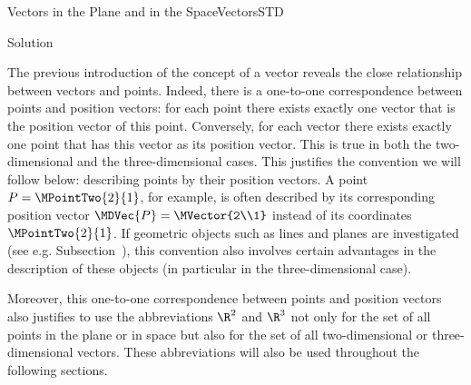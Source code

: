 \begin{MXContent}{Vectors in the Plane and in the Space}{Vectors}{STD}
\begin{MExercise}
\begin{MHint}{Solution}
\begin{itemize}
\begin{center}
\end{center}

\end{itemize}

\end{MHint}

\end{MExercise}

The previous introduction of the concept of a vector reveals the close relationship between vectors and points. Indeed, there 
is a one-to-one correspondence between points and position vectors: for each point there exists exactly one vector that is the position vector
of this point. Conversely, for each vector there exists exactly one point that has this vector as its position vector. 
This is true in both the two-dimensional and the three-dimensional cases. This justifies the convention we will follow below: 
describing points by their position vectors. A point $P=\MPointTwo{2}{1}$, for example, is often described by its corresponding 
position vector $\MDVec{P}=\MVector{2\\1}$ instead of its coordinates $\MPointTwo{2}{1}$. If geometric objects such as lines 
and planes are investigated (see e.g. Subsection~), this convention also involves certain 
advantages in the description of these objects (in particular in the three-dimensional case).

Moreover, this one-to-one correspondence between points and position vectors also justifies to use the abbreviations 
$\R^2$ and $\R^3$ not only for the set of all points in the plane or in space but also for the set of all 
two-dimensional or three-dimensional vectors. These abbreviations will also be used throughout the following sections.

\end{MXContent}

